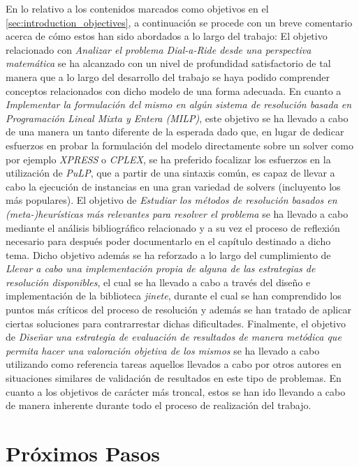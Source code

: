 \documentclass{subfiles}
\begin{document}
      En lo relativo a los contenidos marcados como objetivos en el \cref{sec:introduction_objectives}, a continuación se procede con un breve comentario acerca de cómo estos han sido abordados a lo largo del trabajo: El objetivo relacionado con \emph{Analizar el problema Dial-a-Ride desde una perspectiva matemática} se ha alcanzado con un nivel de profundidad satisfactorio de tal manera que a lo largo del desarrollo del trabajo se haya podido comprender conceptos relacionados con dicho modelo de una forma adecuada. En cuanto a \emph{Implementar la formulación del mismo en algún sistema de resolución basada en Programación Lineal Mixta y Entera (MILP)}, este objetivo se ha llevado a cabo de una manera un tanto diferente de la esperada dado que, en lugar de dedicar esfuerzos en probar la formulación del modelo directamente sobre un solver como por ejemplo \emph{XPRESS} o \emph{CPLEX}, se ha preferido focalizar los esfuerzos en la utilización de \emph{PuLP}, que a partir de una sintaxis común, es capaz de llevar a cabo la ejecución de instancias en una gran variedad de solvers (incluyento los más populares). El objetivo de \emph{Estudiar los métodos de resolución basados en (meta-)heurísticas más relevantes para resolver el problema} se ha llevado a cabo mediante el análisis bibliográfico relacionado y a su vez el proceso de reflexión necesario para después poder documentarlo en el capítulo destinado a dicho tema. Dicho objetivo además se ha reforzado a lo largo del cumplimiento de \emph{Llevar a cabo una implementación propia de alguna de las estrategias de resolución disponibles}, el cual se ha llevado a cabo a través del diseño e implementación de la biblioteca \emph{jinete}, durante el cual se han comprendido los puntos más críticos del proceso de resolución y además se han tratado de aplicar ciertas soluciones para contrarrestar dichas dificultades. Finalmente, el objetivo de \emph{Diseñar una estrategia de evaluación de resultados de manera metódica que permita hacer una valoración objetiva de los mismos} se ha llevado a cabo utilizando como referencia tareas aquellos llevados a cabo por otros autores en situaciones similares de validación de resultados en este tipo de problemas. En cuanto a los objetivos de carácter más troncal, estos se han ido llevando a cabo de manera inherente durante todo el proceso de realización del trabajo.

    \section{Próximos Pasos}
    \label{sec:conclusion_next_steps}
\end{document}
